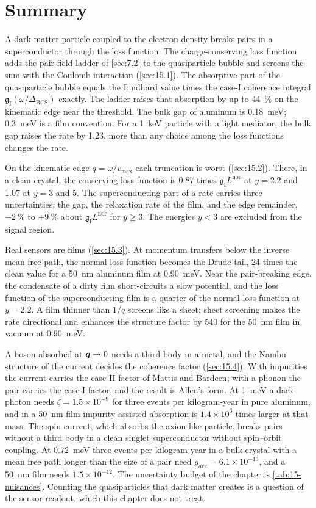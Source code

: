 \section*{Summary}

A dark-matter particle coupled to the electron density breaks pairs in a superconductor through the loss function. The charge-conserving loss function adds the pair-field ladder of \cref{sec:7.2} to the quasiparticle bubble and screens the sum with the Coulomb interaction (\cref{sec:15.1}). The absorptive part of the quasiparticle bubble equals the Lindhard value times the case-I coherence integral $\mathfrak{g}_{\mathrm{I}}(\omega/\Delta_{\mathrm{BCS}})$ exactly. The ladder raises that absorption by up to \SI{44}{\percent} on the kinematic edge near the threshold. The bulk gap of aluminum is \SI{0.18}{meV}; \SI{0.3}{meV} is a film convention. For a \SI{1}{keV} particle with a light mediator, the bulk gap raises the rate by 1.23, more than any choice among the loss functions changes the rate.

On the kinematic edge $q = \omega/v_{\mathrm{max}}$ each truncation is worst (\cref{sec:15.2}). There, in a clean crystal, the conserving loss function is 0.87 times $\mathfrak{g}_{\mathrm{I}}L^{\mathrm{nor}}$ at $y = 2.2$ and 1.07 at $y = 3$ and 5. The superconducting part of a rate carries three uncertainties: the gap, the relaxation rate of the film, and the edge remainder, $-\SI{2}{\percent}$ to $+\SI{9}{\percent}$ about $\mathfrak{g}_{\mathrm{I}}L^{\mathrm{nor}}$ for $y \ge 3$. The energies $y < 3$ are excluded from the signal region.

Real sensors are films (\cref{sec:15.3}). At momentum transfers below the inverse mean free path, the normal loss function becomes the Drude tail, 24 times the clean value for a \SI{50}{nm} aluminum film at \SI{0.90}{meV}. Near the pair-breaking edge, the condensate of a dirty film short-circuits a slow potential, and the loss function of the superconducting film is a quarter of the normal loss function at $y = 2.2$. A film thinner than $1/q$ screens like a sheet; sheet screening makes the rate directional and enhances the structure factor by 540 for the \SI{50}{nm} film in vacuum at \SI{0.90}{meV}.

A boson absorbed at $\bm{q} \to 0$ needs a third body in a metal, and the Nambu structure of the current decides the coherence factor (\cref{sec:15.4}). With impurities the current carries the case-II factor of Mattis and Bardeen; with a phonon the pair carries the case-I factor, and the result is Allen's form. At \SI{1}{meV} a dark photon needs $\zeta = 1.5\times10^{-9}$ for three events per kilogram-year in pure aluminum, and in a \SI{50}{nm} film impurity-assisted absorption is $1.4\times10^6$ times larger at that mass. The spin current, which absorbs the axion-like particle, breaks pairs without a third body in a clean singlet superconductor without spin--orbit coupling. At \SI{0.72}{meV} three events per kilogram-year in a bulk crystal with a mean free path longer than the size of a pair need $g_{aee} = 6.1\times10^{-13}$, and a \SI{50}{nm} film needs $1.5\times10^{-12}$. The uncertainty budget of the chapter is \cref{tab:15-nuisances}. Counting the quasiparticles that dark matter creates is a question of the sensor readout, which this chapter does not treat.
